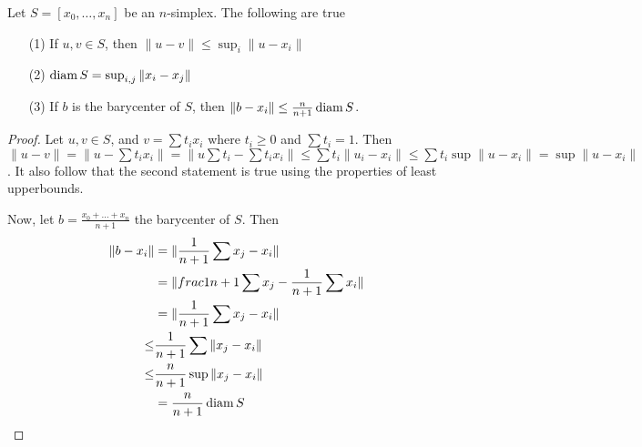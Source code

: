 \begin{theorem}\label{3.1.7}
    Let $S=[x_0, \dots, x_n]$ be an $n$-simplex. The following are true
    \begin{enumerate}
        \item[(1)] If $u,v \in S$, then $\|u-v\| \leq \sup_{i}{\|u-x_i\|}$

        \item[(2)] $\operatorname{diam}{S}=\sup_{i,j}{\|x_i-x_j\|}$

        \item[(3)] If $b$ is the barycenter of $S$, then $\|b-x_i\| \leq
            \frac{n}{n+1}\operatorname{diam}{S}$.
    \end{enumerate}
\end{theorem}
\begin{proof}
    Let $u,v \in S$, and  $v=\sum{t_ix_i}$ where $t_i \geq 0$ and
    $\sum{t_i}=1$. Then $\|u-v\|=\|u-\sum{t_ix_i}\|=\|u\sum{t_i}-\sum{t_ix_i}\|
    \leq \sum{t_i\|u_i-x_i\|} \leq \sum{t_i\sup{\|u-x_i\|}}=\sup{\|u-x_i\|}$. It
    also follow that the second statement is true using the properties of
    least upperbounds.

    Now, let $b=\frac{x_0+\dots+x_n}{n+1}$ the barycenter of $S$. Then
    \begin{align*}
        \|b-x_i\|       &=      \|\frac{1}{n+1}\sum{x_j}-x_i\|    \\
                      &=      \|frac{1}{n+1}\sum{x_j}-\frac{1}{n+1}\sum{x_i}\|  \\
                      &=      \|\frac{1}{n+1}\sum{x_j-x_i}\|        \\
                 \leq &       \frac{1}{n+1}\sum{\|x_j-x_i\|}    \\
                 \leq &       \frac{n}{n+1}\sup{\|x_j-x_i\|}    \\
                      &=      \frac{n}{n+1}\operatorname{diam}{S}     \\
    \end{align*}
\end{proof}

